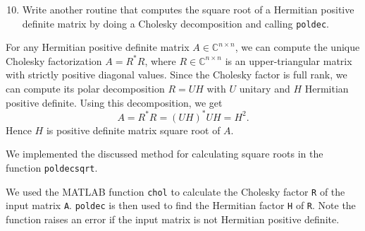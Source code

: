 \documentclass[10pt, A4paper]{article}
\newcommand{\nxn}{n \times n}
\begin{document}
\vspace{0.2cm}
\begin{enumerate}
	\setcounter{enumi}{9}
	\item Write another routine that computes the square root of a 
	Hermitian positive definite matrix by doing a Cholesky 
	decomposition and calling \texttt{poldec}.
\end{enumerate}

For any Hermitian positive definite matrix $A \in \mathbb{C}^{\nxn}$, 
we can compute the unique Cholesky factorization $A = R^*R$, where $R 
\in \mathbb{C}^{\nxn}$ is an upper-triangular matrix with strictly 
positive diagonal values.
Since the Cholesky factor is full rank, we can compute its polar 
decomposition $R = UH$ with $U$ unitary and $H$ Hermitian positive 
definite.
Using this decomposition, we get $$A = R^*R = (UH)^*UH = H^2.$$
Hence $H$ is positive definite matrix square root of $A$.

We implemented the discussed method for calculating square roots in the 
function \texttt{poldecsqrt}.

{\small
}

We used the MATLAB function \texttt{chol} to calculate the Cholesky 
factor \texttt{R} of the input matrix \texttt{A}.
\texttt{poldec} is then used to find the Hermitian factor \texttt{H} of 
\texttt{R}. Note the function raises an error if the input matrix is 
not Hermitian positive definite.




\end{document}
